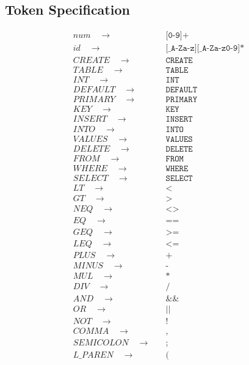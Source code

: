 \documentclass{article}
\begin{document}
\subsection {Token Specification}
\begin{align*}
num \quad\to\quad & \texttt{[0-9]+} \\
id \quad\to\quad & \texttt{[\_A-Za-z][\_A-Za-z0-9]*} \\
CREATE \quad\to\quad & \texttt{CREATE} \\
TABLE \quad\to\quad & \texttt{TABLE} \\
INT \quad\to\quad & \texttt{INT} \\
DEFAULT \quad\to\quad & \texttt{DEFAULT} \\
PRIMARY \quad\to\quad & \texttt{PRIMARY} \\
KEY \quad\to\quad & \texttt{KEY} \\
INSERT \quad\to\quad & \texttt{INSERT} \\
INTO \quad\to\quad & \texttt{INTO} \\
VALUES \quad\to\quad & \texttt{VALUES} \\
DELETE \quad\to\quad & \texttt{DELETE} \\
FROM \quad\to\quad & \texttt{FROM} \\
WHERE \quad\to\quad & \texttt{WHERE} \\
SELECT \quad\to\quad & \texttt{SELECT} \\
LT \quad\to\quad & \texttt{<} \\
GT \quad\to\quad & \texttt{>} \\
NEQ \quad\to\quad & \texttt{<>} \\
EQ \quad\to\quad & \texttt{==} \\
GEQ \quad\to\quad & \texttt{>=} \\
LEQ \quad\to\quad & \texttt{<=} \\
PLUS \quad\to\quad & \texttt{+} \\
MINUS \quad\to\quad & \texttt{-} \\
MUL \quad\to\quad & \texttt{*} \\
DIV \quad\to\quad & \texttt{/} \\
AND \quad\to\quad & \texttt{\&\&} \\
OR \quad\to\quad & \texttt{||} \\
NOT \quad\to\quad & \texttt{!} \\
COMMA \quad\to\quad & \texttt{,} \\
SEMICOLON \quad\to\quad & \texttt{;} \\
L\_PAREN \quad\to\quad & \texttt{(} \\

\end{align*}
\end{document}
